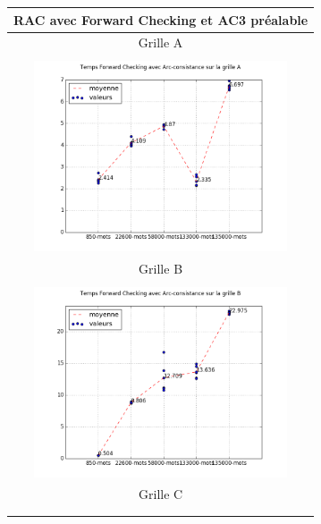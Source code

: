 \documentclass[a4paper,12pt]{report}
\begin{document}
\begin{enumerate}
\begin{table}[!h]
\begin{center}
\begin{tabular}{|c|}
\end{tabular}
\end{center}
\end{table}

\begin{table}[!h]
\begin{center}
\begin{tabular}{|c|}
\hline
 {RAC avec Forward Checking et AC3 préalable} \\
\hline
\hline
  Grille A\\
\hline   
   \\
\includegraphics[width=7.5cm]{FC_AC3_A.png}  \\
\hline
Grille B \\
\hline 
\\
\includegraphics[width=7.5cm]{FC_AC3_B.png} \\
\hline
Grille C\\
\hline
  \\
 \\
\hline

\end{tabular}
\end{center}
\end{table}



\end{enumerate}
\end{document}
